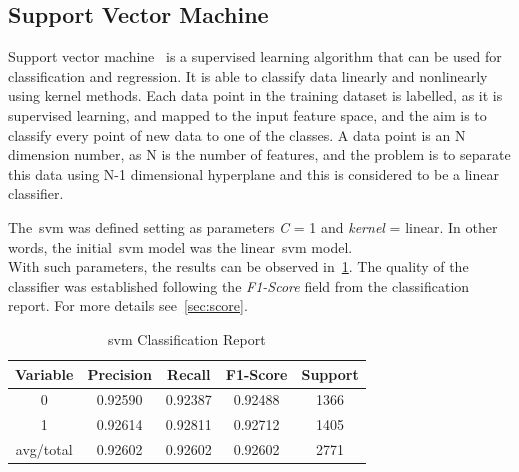 \subsection{Support Vector Machine}
Support vector machine~\cite{svm} is a supervised learning algorithm that can be used for classification and regression. It is able to classify data linearly and nonlinearly using kernel methods. Each data point in the training dataset is labelled, as it is supervised learning, and mapped to the input feature space, and the aim is to classify every point of new data to one of the classes. A data point is an N dimension number, as N is the number of features, and the problem is to separate this data using N-1 dimensional hyperplane and this is considered to be a linear classifier.\par
The~\ac{svm} was defined setting as parameters \textit{C} = 1 and \textit{kernel} = linear. In other words, the initial~\ac{svm} model was the linear~\ac{svm} model.\\
With such parameters, the results can be observed in~\cref{tab:sv1}. The quality of the classifier was established following the \textit{F1-Score} field from the classification report. For more details see~\cref{sec:score}. 

\begin{table}[h!]
	\centering
	\begin{tabular}{||c c c c c||} 
		\hline
		Variable & Precision & Recall & F1-Score & Support \\ [0.5ex] 
		\hline\hline
		0 & 0.92590 & 0.92387 & 0.92488 & 1366 \\ 
		1 & 0.92614 & 0.92811 & 0.92712 & 1405 \\
		avg/total & 0.92602 & 0.92602 & 0.92602 & 2771 \\
		[1ex] 
		\hline
	\end{tabular}
	\caption{\acl{svm} Classification Report}
	\label{tab:sv1}
\end{table}
